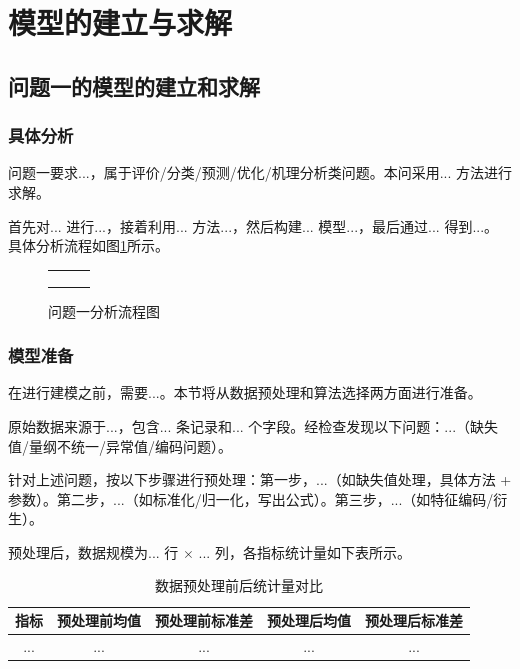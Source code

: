 \newpage
\section{模型的建立与求解}
\subsection{问题一的模型的建立和求解}
\subsubsection{具体分析}

问题一要求...，属于评价/分类/预测/优化/机理分析类问题。本问采用... 方法进行求解。

首先对... 进行...，接着利用... 方法...，然后构建... 模型...，最后通过... 得到...。具体分析流程如图\ref{fig:problem1-flow}所示。

\begin{figure}[htbp]
	\centering
	\begin{tabular}{ccc}
		\fbox{\makebox[0.22\textwidth][c]{步骤 1}} &
		\fbox{\makebox[0.22\textwidth][c]{步骤 2}} &
		\fbox{\makebox[0.22\textwidth][c]{步骤 3}} \\[1em]
		\fbox{\makebox[0.22\textwidth][c]{步骤 4}} &
		\fbox{\makebox[0.22\textwidth][c]{步骤 5}} &
		\fbox{\makebox[0.22\textwidth][c]{步骤 6}} \\[1em]
		\fbox{\makebox[0.22\textwidth][c]{步骤 7}} &
		\fbox{\makebox[0.22\textwidth][c]{步骤 8}} &
		\fbox{\makebox[0.22\textwidth][c]{步骤 9}}
	\end{tabular}
	\caption{问题一分析流程图}
	\label{fig:problem1-flow}
\end{figure}

\subsubsection{模型准备}

在进行建模之前，需要...。本节将从数据预处理和算法选择两方面进行准备。

原始数据来源于...，包含... 条记录和... 个字段。经检查发现以下问题：...（缺失值/量纲不统一/异常值/编码问题）。

针对上述问题，按以下步骤进行预处理：第一步，...（如缺失值处理，具体方法 + 参数）。第二步，...（如标准化/归一化，写出公式）。第三步，...（如特征编码/衍生）。

预处理后，数据规模为... 行 $\times$ ... 列，各指标统计量如下表所示。

\begin{table}[htbp]
	\caption{数据预处理前后统计量对比}
	\centering
	\begin{tabular}{ccccc}
		\toprule
		指标 & 预处理前均值 & 预处理前标准差 & 预处理后均值 & 预处理后标准差 \\
		\midrule
		... & ... & ... & ... & ... \\
		\bottomrule
	\end{tabular}
\end{table}

